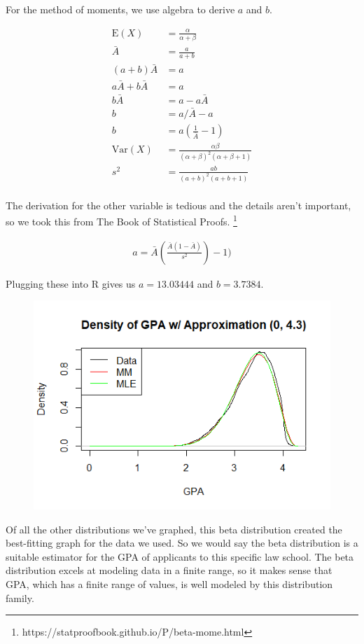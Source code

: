 \documentclass[12pt, a4paper, oneside]{report}
\begin{document}
For the method of moments, we use algebra to derive $a$ and $b$.

\begin{align*}
  \mathrm{E}(X) &= \frac{\alpha}{\alpha+\beta} \\
  \bar{A} &= \frac{a}{a+b} \\
  (a + b)\bar{A} &= a \\
  a\bar{A} + b\bar{A} &= a \\
  b\bar{A} &= a - a\bar{A} \\
  b &= a / \bar{A} - a \\
  b &= a \left( \frac{1}{\bar{A}} - 1 \right) \\
  \mathrm{Var}(X) &= \frac{\alpha\beta}{(\alpha+\beta)^2 (\alpha+\beta+1)} \\
  s^2 &= \frac{ab}{(a+b)^2 (a+b+1)} \\
\end{align*}

The derivation for the other variable is tedious and the details aren't important, so we took this from The Book of Statistical Proofs.
\footnote{https://statproofbook.github.io/P/beta-mome.html}

\begin{align*}
  a = \bar{A}(\frac{\bar{A}(1-\bar{A})}{s^2})-1)
\end{align*}

Plugging these into R gives us $a = 13.03444$ and $b = 3.7384$.

\begin{figure}[h]
  \centering
  \includegraphics[width=\linewidth]{betaDensityA43.png}
\end{figure}
\newpage

Of all the other distributions we’ve graphed, this beta distribution created the best-fitting graph for the data we used. So we would say the beta distribution is a suitable estimator for the GPA of applicants to this specific law school. The beta distribution excels at modeling data in a finite range, so it makes sense that GPA, which has a finite range of values, is well modeled by this distribution family. 
\end{document}
